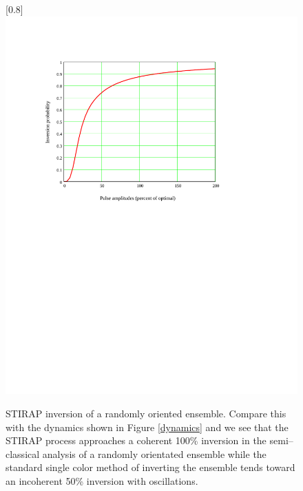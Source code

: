 \begin{figure}
\scalebox{0.8}[0.8]{
\includegraphics[bb=10 415 489 700]
{polarization/polarization.pdf}
}
\caption[STIRAP inversion of a randomly oriented ensemble]{STIRAP inversion of a randomly oriented ensemble. Compare this with the dynamics shown in Figure \ref{dynamics} and we see that the STIRAP process approaches a coherent 100\% inversion in the semi--classical analysis of a randomly orientated ensemble while the standard single color method of inverting the ensemble tends toward an incoherent 50\% inversion with oscillations.}
\label{polarization}
\end{figure}
